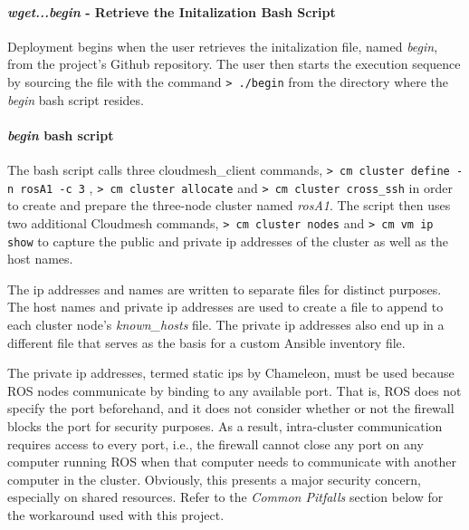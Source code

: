 \documentclass[9pt,twocolumn,twoside]{../../styles/osajnl}
\begin{document}
\paragraph{\textit{wget...begin} - Retrieve the Initalization Bash Script}
Deployment begins when the user retrieves the initalization file, named \textit{begin}, from the project's Github repository.  The user then starts the execution sequence by sourcing the file with the command \newline
{\color{green} \lstinline[style=BashInputStyle]!> ./begin! } \newline
from the directory where the \textit{begin} bash script resides.  

\paragraph{\textit{begin} bash script}
The bash script calls three cloudmesh\_client commands, {\color{green} \lstinline[style=BashInputStyle]!> cm cluster define -n rosA1 -c 3! }, {\color{green} \lstinline[style=BashInputStyle]!> cm cluster allocate! } and {\color{green} \lstinline[style=BashInputStyle]!> cm cluster cross_ssh! } in order to create and prepare the three-node cluster named \textit{rosA1}.  The script then uses two additional Cloudmesh commands, {\color{green} \lstinline[style=BashInputStyle]!> cm cluster nodes! } and {\color{green} \lstinline[style=BashInputStyle]!> cm vm ip show! } to capture the public and private ip addresses of the cluster as well as the host names.  

The ip addresses and names are written to separate files for distinct purposes.  The host names and private ip addresses are used to create a file to append to each cluster node's \textit{known\_hosts} file.  The private ip addresses also end up in a different file that serves as the basis for a custom Ansible inventory file.  

The private ip addresses, termed static ips by Chameleon, must be used because ROS nodes communicate by binding to any available port.  That is, ROS does not specify the port beforehand, and it does not consider whether or not the firewall blocks the port for security purposes.  As a result, intra-cluster communication requires access to every port, i.e., the firewall cannot close any port on any computer running ROS when that computer needs to communicate with another computer in the cluster.  Obviously, this presents a major security concern, especially on shared resources. Refer to the \textit{Common Pitfalls} section below for the workaround used with this project.
\end{document}
